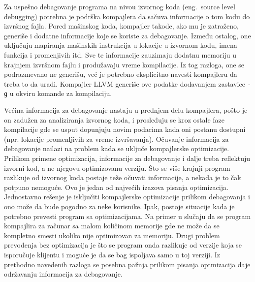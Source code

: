 \documentclass[12pt,oneside]{memoir}
\begin{document}
Za uspešno debagovanje programa na nivou izvornog koda (eng.~{source level debugging}) potrebna je podrška kompajlera da sačuva informacije o tom kodu do izvršnog fajla.
Pored mašinskog koda, kompajler takođe, ako mu je zatraženo, generiše i dodatne informacije koje se koriste za debagovanje.
Između ostalog, one uključuju mapiranja mašinskih instrukcija u lokacije u izvornom kodu, imena funkcija i promenjivih itd.
Sve te informacije zauzimaju dodatnu memoriju u krajnjem izvršnom fajlu i produžavaju vreme kompilacije.
Iz tog razloga, one se podrazmevano ne generišu, već je potrebno eksplicitno navesti kompajleru da treba to da uradi.
Kompajler LLVM generiše ove podatke dodavanjem zastavice \verb|-g| u okviru komande za kompilaciju.

Većina informacija za debagovanje nastaju u prednjem delu kompajlera, pošto je on zadužen za analiziranja izvornog koda, i prosleđuju se kroz ostale faze kompilacije gde se usput dopunjuju novim podacima kada oni postanu dostupni (npr. lokacije promenljivih za vreme izvršavanja). %
Očuvanje informacija za debagovanje nailazi na problem kada se uključe kompajlerske optimizacije.
Prilikom primene optimizacija, informacije za debagovanje i dalje treba reflektuju izvorni kod, a ne njegovu optimizovanu verziju.
Što se više krajnji program razlikuje od izvornog koda postaje teže očuvati informacije, a nekada je to čak potpuno nemoguće.
Ovo je jedan od najvećih izazova pisanja optimizacija.
Jednostavno rešenje je isključiti kompajlerske optimizacije prilikom debagovanja i ono može da bude pogodno za neke korisnike.
Ipak, postoje situacije kada je potrebno prevesti program sa optimizacijama.
Na primer u slučaju da se program kompajlira za računar sa malom količinom memorije gde ne može da se kompletno smesti ukoliko nije optimizovan za memoriju.
Drugi problem prevođenja bez optimizacija je što se program onda razlikuje od verzije koja se isporučuje klijentu i moguće je da se bag ispoljava samo u toj verziji.
Iz prethodno navedenih razloga se posebna pažnja prilikom pisanja optmizacija daje održavanju informacija za debagovanje.
\end{document}
